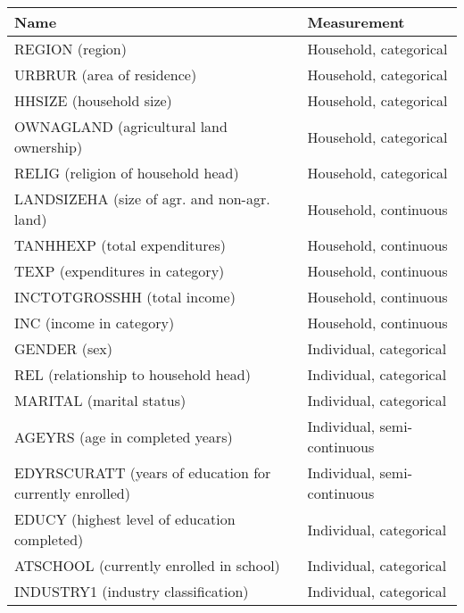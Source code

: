\documentclass[letterpaper,10pt,english]{sphinxmanual}
\begin{document}
\begin{savenotes}\sphinxattablestart
\centering
{}
\label{\detokenize{case_studies:tab92}}\label{\detokenize{case_studies:id16}}
\sphinxaftercaption
\begin{tabulary}{\linewidth}[t]{|T|T|}
\hline
\sphinxstyletheadfamily 
Name
&\sphinxstyletheadfamily 
Measurement
\\
\hline
REGION (region)
&
Household, categorical
\\
\hline
URBRUR (area of residence)
&
Household, categorical
\\
\hline
HHSIZE (household size)
&
Household, categorical
\\
\hline
OWNAGLAND (agricultural land ownership)
&
Household, categorical
\\
\hline
RELIG (religion of household  head)
&
Household, categorical
\\
\hline
LANDSIZEHA (size of agr. and non-agr. land)
&
Household, continuous
\\
\hline
TANHHEXP (total expenditures)
&
Household, continuous
\\
\hline
TEXP (expenditures in category)
&
Household, continuous
\\
\hline
INCTOTGROSSHH (total income)
&
Household, continuous
\\
\hline
INC (income in category)
&
Household, continuous
\\
\hline
GENDER (sex)
&
Individual, categorical
\\
\hline
REL (relationship to household head)
&
Individual, categorical
\\
\hline
MARITAL (marital status)
&
Individual, categorical
\\
\hline
AGEYRS (age in completed years)
&
Individual, semi-continuous
\\
\hline
EDYRSCURATT (years of education for currently enrolled)
&
Individual, semi-continuous
\\
\hline
EDUCY (highest level of education completed)
&
Individual, categorical
\\
\hline
ATSCHOOL (currently enrolled in school)
&
Individual, categorical
\\
\hline
INDUSTRY1 (industry classification)
&
Individual, categorical
\\
\hline
\end{tabulary}
\par
\sphinxattableend\end{savenotes}
\end{document}
